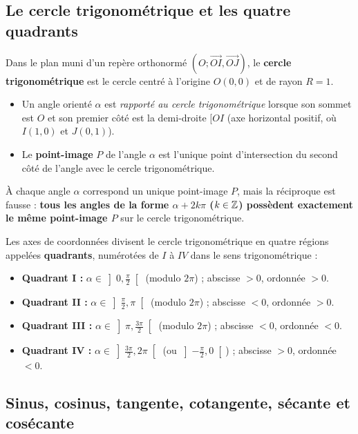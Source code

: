 \subsection{Le cercle trigonométrique et les quatre quadrants}

\begin{definition}
Dans le plan muni d'un repère orthonormé $(O; \vec{OI}, \vec{OJ})$, le \textbf{cercle trigonométrique} est le cercle centré à l'origine $O(0,0)$ et de rayon $R = 1$.
\begin{itemize}
    \item Un angle orienté $\alpha$ est \emph{rapporté au cercle trigonométrique} lorsque son sommet est $O$ et son premier côté est la demi-droite $[OI$ (axe horizontal positif, où $I(1,0)$ et $J(0,1)$).
    \item Le \textbf{point-image} $P$ de l'angle $\alpha$ est l'unique point d'intersection du second côté de l'angle avec le cercle trigonométrique.
\end{itemize}
\end{definition}

À chaque angle $\alpha$ correspond un unique point-image $P$, mais la réciproque est fausse : \textbf{tous les angles de la forme $\alpha + 2k\pi$ ($k \in \mathbb{Z}$) possèdent exactement le même point-image $P$} sur le cercle trigonométrique.

Les axes de coordonnées divisent le cercle trigonométrique en quatre régions appelées \textbf{quadrants}, numérotées de $I$ à $IV$ dans le sens trigonométrique :
\begin{itemize}
    \item \textbf{Quadrant I :} $\alpha \in \left]0, \frac{\pi}{2}\right[$ (modulo $2\pi$) ; abscisse $>0$, ordonnée $>0$.
    \item \textbf{Quadrant II :} $\alpha \in \left]\frac{\pi}{2}, \pi\right[$ (modulo $2\pi$) ; abscisse $<0$, ordonnée $>0$.
    \item \textbf{Quadrant III :} $\alpha \in \left]\pi, \frac{3\pi}{2}\right[$ (modulo $2\pi$) ; abscisse $<0$, ordonnée $<0$.
    \item \textbf{Quadrant IV :} $\alpha \in \left]\frac{3\pi}{2}, 2\pi\right[$ (ou $\left]-\frac{\pi}{2}, 0\right[$) ; abscisse $>0$, ordonnée $<0$.
\end{itemize}

\subsection{Sinus, cosinus, tangente, cotangente, sécante et cosécante}

